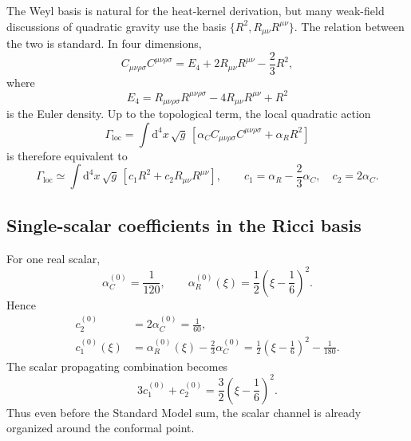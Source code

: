 \documentclass[11pt,a4paper]{article}
\newcommand{\dd}{\mathrm{d}}
\newcommand{\Weylsq}{C_{\mu\nu\rho\sigma}C^{\mu\nu\rho\sigma}}
\newcommand{\Rsq}{R^2}
\newcommand{\Ricsq}{R_{\mu\nu}R^{\mu\nu}}
\theoremstyle{definition}
\theoremstyle{remark}
\begin{document}
The Weyl basis is natural for the heat-kernel derivation, but many
weak-field discussions of quadratic gravity use the basis
$\{R^2,\Ricsq\}$.  The relation between the two is standard.  In four
dimensions,
\begin{equation}
  \Weylsq
  = E_4 + 2\Ricsq - \frac{2}{3}\Rsq,
  \label{eq:weyl-conversion}
\end{equation}
where
\begin{equation}
  E_4
  = R_{\mu\nu\rho\sigma}R^{\mu\nu\rho\sigma}
  - 4R_{\mu\nu}R^{\mu\nu}
  + R^2
  \label{eq:euler-density}
\end{equation}
is the Euler density.  Up to the topological term, the local quadratic action
\begin{equation}
  \Gamma_{\mathrm{loc}}
  = \int \dd^4x\,\sqrt{g}\,
  \left[
    \alpha_C\Weylsq + \alpha_R\Rsq
  \right]
  \label{eq:weyl-basis-local}
\end{equation}
is therefore equivalent to
\begin{equation}
  \Gamma_{\mathrm{loc}}
  \simeq
  \int \dd^4x\,\sqrt{g}\,
  \left[
    c_1 \Rsq + c_2 \Ricsq
  \right],
  \qquad
  c_1 = \alpha_R - \frac{2}{3}\alpha_C,
  \quad
  c_2 = 2\alpha_C.
  \label{eq:c1c2-conversion}
\end{equation}

\subsection{Single-scalar coefficients in the Ricci basis}

For one real scalar,
\begin{equation}
  \alpha_C^{(0)} = \frac{1}{120},
  \qquad
  \alpha_R^{(0)}(\xi) = \frac{1}{2}\left(\xi-\frac{1}{6}\right)^2.
  \label{eq:single-scalar-alphas}
\end{equation}
Hence
\begin{align}
  c_2^{(0)}
  &= 2\alpha_C^{(0)}
   = \frac{1}{60},
  \label{eq:c2-single}\\[4pt]
  c_1^{(0)}(\xi)
  &= \alpha_R^{(0)}(\xi) - \frac{2}{3}\alpha_C^{(0)}
   = \frac{1}{2}\left(\xi-\frac{1}{6}\right)^2 - \frac{1}{180}.
  \label{eq:c1-single}
\end{align}
The scalar propagating combination becomes
\begin{equation}
  3c_1^{(0)} + c_2^{(0)}
  = \frac{3}{2}\left(\xi-\frac{1}{6}\right)^2.
  \label{eq:single-scalar-prop}
\end{equation}
Thus even before the Standard Model sum, the scalar channel is already
organized around the conformal point.
\end{document}
